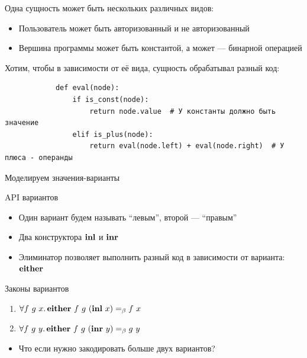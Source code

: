 
    \begin{frame}[fragile]{\subsecname}
        Одна сущность может быть нескольких различных видов:
        \begin{itemize}
            \item Пользователь может быть авторизованный и не авторизованный
            \item Вершина программы может быть константой, а может --- бинарной операцией
        \end{itemize}
        \pause
        \vspace{1em}
        Хотим, чтобы в зависимости от её вида, сущность обрабатывал разный код:
        \begin{verbatim}
            def eval(node):
                if is_const(node):
                    return node.value  # У константы должно быть значение
                elif is_plus(node):
                    return eval(node.left) + eval(node.right)  # У плюса - операнды
        \end{verbatim}
    \end{frame}

    \begin{frame}[fragile]{Моделируем значения-варианты}
        \pause
        \begin{block}{API вариантов}
            \begin{itemize}
                \item Один вариант будем называть ``левым'', второй --- ``правым''
                \item Два конструктора $\mathbf{inl}$ и $\mathbf{inr}$
                \item Элиминатор позволяет выполнить разный код в зависимости от варианта: $\mathbf{either}$
            \end{itemize}
        \end{block}
        \pause
        \begin{block}{Законы вариантов}
            \begin{enumerate}
                \item $\forall f~g~x \ldotp \mathbf{either} ~ f ~ g ~ (\mathbf{inl} ~ x) =_\beta f ~ x$
                \item $\forall f~g~y \ldotp \mathbf{either} ~ f ~ g ~ (\mathbf{inr} ~ y) =_\beta g ~ y$
            \end{enumerate}
        \end{block}
        \begin{itemize}
            \item[\todo] Что если нужно закодировать больше двух вариантов?
        \end{itemize}
    \end{frame}

